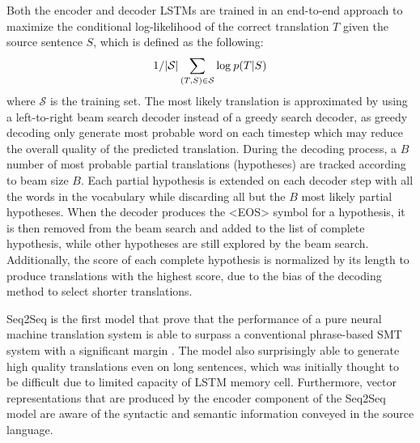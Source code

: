 \documentclass[12pt]{extarticle}
\begin{document}
Both the encoder and decoder LSTMs are trained in an end-to-end approach to maximize the conditional log-likelihood of the correct translation $T$ given the source sentence $S$, which is defined as the following:
\begin{align}
1/ |\mathcal{S}| \sum_{(T,S) \in \mathcal{S}} \textnormal{log}\: p(T|S)
\end{align}
where $\mathcal{S}$ is the training set. The most likely translation is approximated by using a left-to-right beam search decoder instead of a greedy search decoder, as greedy decoding only generate most probable word on each timestep which may reduce the overall quality of the predicted translation. During the decoding process, a $B$ number of most probable partial translations (hypotheses) are tracked according to beam size $B$. Each partial hypothesis is extended on each decoder step with all the words in the vocabulary while discarding all but the $B$ most likely partial hypotheses. When the decoder produces the \textless EOS\textgreater{} symbol for a hypothesis, it is then removed from the beam search and added to the list of complete hypothesis, while other hypotheses are still explored by the beam search. Additionally, the score of each complete hypothesis is normalized by its length to produce translations with the highest score, due to the bias of the decoding method to select shorter translations.

Seq2Seq is the first model that prove that the performance of a pure neural machine translation system is able to surpass a conventional phrase-based SMT system with a significant margin \citep{Sutskever:2014:SSL:2969033.2969173}. The model also surprisingly able to generate high quality translations even on long sentences, which was initially thought to be difficult due to limited capacity of LSTM memory cell. Furthermore, vector representations that are produced by the encoder component of the Seq2Seq model are aware of the syntactic and semantic information conveyed in the source language.  
\end{document}
